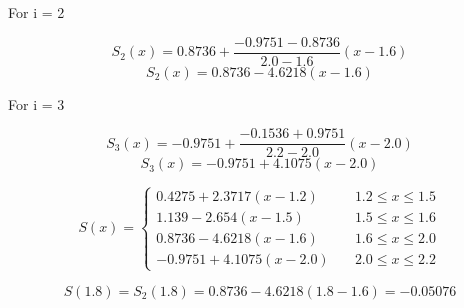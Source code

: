 \documentclass[]{article}
\begin{document}
For i = 2

\[S_2(x) = 0.8736 + \frac{-0.9751 - 0.8736}{2.0-1.6}(x-1.6)\]
\[S_2(x) = 0.8736 - 4.6218(x-1.6)\]

For i = 3

\[S_3(x) = -0.9751 + \frac{-0.1536 + 0.9751}{2.2-2.0}(x-2.0)\]
\[S_3(x) = -0.9751 + 4.1075(x-2.0)\]

\[
S(x) = \left\{
        \begin{array}{ll}
            0.4275 + 2.3717(x-1.2) & \quad 1.2 \leq x \leq 1.5 \\
            1.139 - 2.654(x-1.5) & \quad 1.5 \leq x \leq 1.6 \\
            0.8736 - 4.6218(x-1.6) & \quad 1.6 \leq x \leq 2.0\\
            -0.9751 + 4.1075(x-2.0) & \quad 2.0 \leq x \leq 2.2
        \end{array}
    \right.
\]

\[S(1.8) = S_2(1.8) = 0.8736 - 4.6218(1.8 - 1.6) =  -0.05076\]
\end{document}
